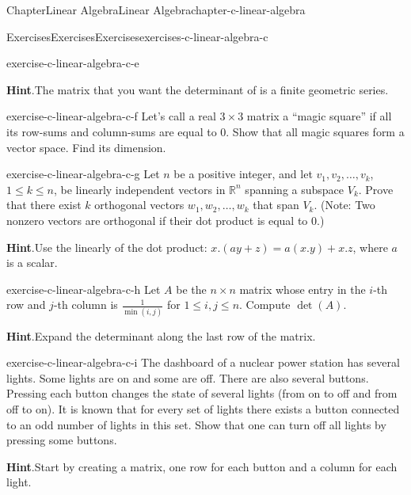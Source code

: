 \documentclass[oneside,10pt,]{book}
\newcommand{\blocktitlefont}{\relax}
\numberwithin{equation}{section}
\begin{document}
\begin{chapterptx}{Chapter}{Linear Algebra}{}{Linear Algebra}{}{}{chapter-c-linear-algebra}
\begin{exercises-section}{Exercises}{Exercises}{}{Exercises}{}{}{exercises-c-linear-algebra-c}
\begin{divisionexercise}{4}{}{}{exercise-c-linear-algebra-c-e}
\par\smallskip%
\noindent\textbf{\blocktitlefont Hint}.\hypertarget{hint-c-linear-algebra-c-e-b}{}\quad{}The matrix that you want the determinant of is a finite geometric series.%
\end{divisionexercise}%
\begin{divisionexercise}{5}{}{}{exercise-c-linear-algebra-c-f}%
Let's call a real \(3 \times 3\) matrix a ``magic square'' if all its row-sums and column-sums are equal to 0. Show that all magic squares form a vector space. Find its dimension.%
\end{divisionexercise}%
\begin{divisionexercise}{6}{}{}{exercise-c-linear-algebra-c-g}%
Let \(n\) be a positive integer, and let \(v_1, v_2, \ldots ,v_k\), \(1\leq k\leq n\), be linearly independent vectors in \(\mathbb{R}^n\) spanning a subspace \(V_k\). Prove that there exist \(k\) orthogonal vectors \(w_1, w_2, \ldots ,w_k\) that span \(V_k\).  (Note: Two nonzero vectors are orthogonal if their dot product is equal to 0.)%
\par\smallskip%
\noindent\textbf{\blocktitlefont Hint}.\hypertarget{hint-c-linear-algebra-c-g-b}{}\quad{}Use the linearly of the dot product: \(x.(a y+z) = a(x.y)+x.z\), where \(a\) is a scalar.%
\end{divisionexercise}%
\begin{divisionexercise}{7}{}{}{exercise-c-linear-algebra-c-h}%
Let \(A\) be the \(n\times n\) matrix whose entry in the \(i\)-th row and \(j\)-th column is \(\frac{1}{\min (i,j)}\) for \(1 \leq  i,j \leq  n\). Compute \(\det (A)\).%
\par\smallskip%
\noindent\textbf{\blocktitlefont Hint}.\hypertarget{hint-c-linear-algebra-c-h-b}{}\quad{}Expand the determinant along the last row of the matrix.%
\end{divisionexercise}%
\begin{divisionexercise}{8}{}{}{exercise-c-linear-algebra-c-i}%
The dashboard of a nuclear power station has several lights. Some lights are on and some are off. There are also several buttons. Pressing each button changes the state of several lights (from on to off and from off to on). It is known that for every set of lights there exists a button connected to an odd number of lights in this set. Show that one can turn off all lights by pressing some buttons.%
\par\smallskip%
\noindent\textbf{\blocktitlefont Hint}.\hypertarget{hint-c-linear-algebra-c-i-b}{}\quad{}Start by creating a matrix, one row for each button and a column for each light.%

\end{divisionexercise}
\end{exercises-section}
\end{chapterptx}
\end{document}
